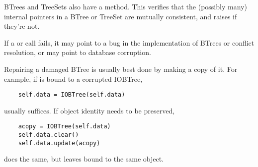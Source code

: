 BTrees and TreeSets also have a  method.  This verifies
that the (possibly many) internal pointers in a BTree or TreeSet
are mutually consistent, and raises  if they're
not.

If a  or  call fails,
it may point to a bug in the implementation of BTrees or conflict
resolution, or may point to database corruption.

Repairing a damaged BTree is usually best done by making a copy of it.
For example, if  is bound to a corrupted IOBTree,

\begin{verbatim}
    self.data = IOBTree(self.data)
\end{verbatim}

usually suffices.  If object identity needs to be preserved,

\begin{verbatim}
    acopy = IOBTree(self.data)
    self.data.clear()
    self.data.update(acopy)
\end{verbatim}

does the same, but leaves  bound to the same object.
